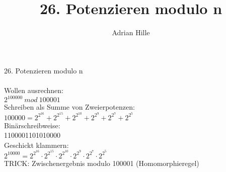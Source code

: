 \documentclass{scrartcl}
\title{26. Potenzieren modulo n}
\author{Adrian Hille}
\begin{document}
\Large 26. Potenzieren modulo n\\
\\
\normalsize
Wollen ausrechnen: \\
$2^{100000}~mod~100001$\\
Schreiben als Summe von Zweierpotenzen:\\
$100000 = 2^{2^{16}} + 2^{2^{15}}+ 2^{2^{10}} + 2^{2^{9}}+2^{2^{7}}+ 2^{2^5}$\\
Bin\"arschreibweise:\\
1100001101010000\\
Geschickt klammern:\\
$2^{10000} = 2^{2^{16}} \cdot 2^{2^{15}} \cdot 2^{2^{10}} \cdot 2^{2^{9}} \cdot 2^{2^{7}} \cdot 2^{2^5}$\\
TRICK: Zwischenergebnis modulo 100001 (Homomorphieregel)\\
\end{document}
